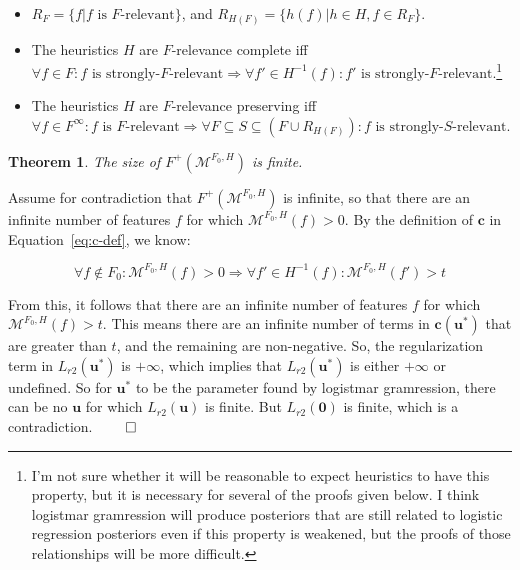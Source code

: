 \documentclass[11pt,letterpaper]{article}
\newtheorem{theorem}{Theorem}[section]
\begin{document}
\begin{itemize}
\item $R_F=\{f|f\text{ is }F\text{-relevant}\}$, 
and $R_{H(F)}=\{h(f)|h\in H, f\in R_F\}$. 

\item The heuristics $H$ are $F$-relevance
complete iff 
$\forall f\in F:f\text{ is strongly-}F
\text{-relevant}\Rightarrow\forall f'\in H^{-1}(f):
f'\text{ is strongly-}F\text{-relevant}$.\footnote{I'm
not sure whether it will be reasonable to expect
heuristics to have this property, but it is necessary for
several of the proofs given below.  I think 
logistmar gramression will produce posteriors that are
still related to logistic regression posteriors even if 
this property is weakened, but the proofs of those
relationships will
be more difficult.}

\item  The heuristics $H$ are 
$F$-relevance preserving iff 
$\forall f\in F^{\infty}: f\text{ is }F\text{-relevant}\Rightarrow\forall F\subseteq S\subseteq (F\cup R_{H(F)}):
f\text{ is strongly-}
S\text{-relevant}$.

\end{itemize}

\begin{theorem}
\label{thm:finite-non-zero}
The size of $F^+(\mathcal{M}^{F_0,H})$ is finite.
\end{theorem}

Assume for contradiction that $F^+(\mathcal{M}^{F_0,H})$
is infinite, so that there are an infinite number
of features $f$ for which $\mathcal{M}^{F_0,H}(f)>0$.
By the definition of
$\mathbf{c}$ in Equation~\ref{eq:c-def}, we know:

\begin{equation}
\label{eq:parents-above-threshold}
\forall f\notin F_0:\mathcal{M}^{F_0,H}(f)>0
\Rightarrow \forall f'\in H^{-1}(f):
\mathcal{M}^{F_0,H}(f')>t
\end{equation}

From this, it follows that
there are an infinite number of features $f$ for which
$\mathcal{M}^{F_0,H}(f)>t$.  This means there 
are an infinite number of terms in 
$\mathbf{c}(\mathbf{u}^*)$ that are greater
than $t$, and the remaining are non-negative.  So, the regularization 
term in $L_{r2}(\mathbf{u}^*)$ is 
$+\infty$, which implies that $L_{r2}(\mathbf{u}^*)$ 
is either $+\infty$ or undefined.  So for 
$\mathbf{u}^*$ to be the parameter found by logistmar 
gramression, there can be no $\mathbf{u}$ for which 
$L_{r2}(\mathbf{u})$ is finite.  But
$L_{r2}(\mathbf{0})$ is finite, which is
a contradiction. $\qed$
\end{document}
